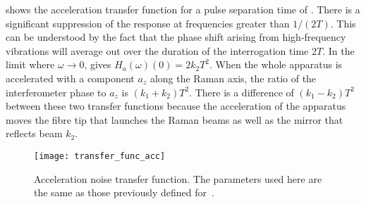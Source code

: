shows the acceleration transfer function for a pulse separation time
of . There is a significant suppression of the
response
at frequencies greater than $1/(2T)$. This can be understood by the
fact that the phase shift arising from
high-frequency vibrations will average out over the duration of the
interrogation time $2T$. In the limit where $\omega \rightarrow 0$,
 gives
  $H_a(\omega)(0) = 2k_{2} T^2$. When the whole apparatus is
  accelerated with a component $a_z$ along the Raman axis, the ratio
  of the interferometer phase to $a_z$ is $(k_1 +k_2)T^2$. There is a
  difference of $(k_1-k_2) T^2$ between these two transfer functions
  because the acceleration of the apparatus moves the fibre tip that
  launches the Raman beams as well as the mirror that reflects beam
  $k_2$.
\begin{figure}[htpb]
  \centering
  \texttt{[image: transfer\_func\_acc]}
  \caption[Acceleration noise transfer function.]{Acceleration noise
  transfer function. The parameters used here are the same as those
previously defined for~.}
  \label{fig:transfer_func_acc}
\end{figure}
